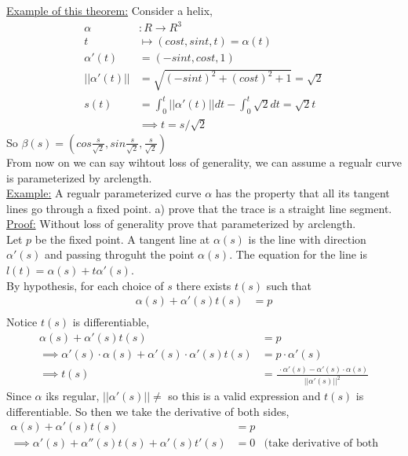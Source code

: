 \documentclass[12pt,letterpaper]{hmcpset}
\begin{document}
\underline{Example of this theorem:} Consider a helix,
\begin{align*}
  \alpha&: R \rightarrow R^3 \\
  t &\mapsto (cos t, sin t, t) = \alpha(t) \\ 
  \alpha'(t) &= (-sin t, cos t, 1) \\
  ||\alpha'(t)|| &= \sqrt{(-sin t)^2 + (cos t)^2 + 1} = \sqrt{2} \\
  s(t) &= \int_0^t||\alpha'(t)||dt - \int_0^t \sqrt{2}dt = \sqrt{2} t \\
  &\implies t = s/\sqrt{2}
\end{align*}
So $\beta(s) = (cos \frac{s}{\sqrt{2}}, sin \frac{s}{\sqrt{2}}, \frac{s}{\sqrt{2}})$
\\
From now on we can say wihtout loss of generality, we can assume a regualr
curve is parameterized by arclength. \\
\underline{Example:} A regualr parameterized curve $\alpha$ has the property that all
its tangent lines go through a fixed point. 
a) prove that the trace is a straight line segment. \\
\underline{Proof:} Without loss of generality prove that parameterized by
arclength. \\
Let $p$ be the fixed point. A tangent line at $\alpha(s)$ is the line with direction
$\alpha'(s)$ and
passing throguht the point $\alpha(s)$. The equation for the line is $l(t) = \alpha(s) + t
\alpha'(s)$. \\
By hypothesis, for each choice of $s$ there exists $t(s)$ such that
\begin{align*}
  \alpha(s) + \alpha'(s)t(s) &= p \\
\end{align*}
Notice $t(s)$ is differentiable,
\begin{align*}
  \alpha(s) + \alpha'(s)t(s) &= p \\
  \implies \alpha'(s) \cdot \alpha(s) + \alpha'(s) \cdot \alpha'(s) t(s) &= p \cdot \alpha'(s) \\
  \implies t(s) &= \frac{\ \cdot \alpha'(s) - \alpha'(s) \cdot \alpha(s)}{||\alpha'(s)||^2}
\end{align*}
Since $\alpha$ iks regular, $||\alpha'(s)|| \neq$ so this is a valid expression and $t(s)$ is
differentiable. So then we take the derivative of both sides,
\begin{align*}
  \alpha(s) + \alpha'(s)t(s) &= p \\
  \implies \alpha'(s) + \alpha''(s)t(s) + \alpha'(s)t'(s) &= 0 & \text{(take derivative of both sides)} \\
\end{align*}
\end{document}
